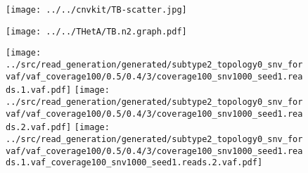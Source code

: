 \documentclass{article}
\begin{document}
\begin{figure}[H]
 \texttt{[image: ../../cnvkit/TB-scatter.jpg]}
\end{figure}

\begin{figure}[H]
  \texttt{[image: ../../THetA/TB.n2.graph.pdf]}
\end{figure}

\begin{figure}[H]
\end{figure}

\begin{figure}[H]
\end{figure}

\begin{figure}[H]
 \texttt{[image: ../src/read\_generation/generated/subtype2\_topology0\_snv\_forvaf/vaf\_coverage100/0.5/0.4/3/coverage100\_snv1000\_seed1.reads.1.vaf.pdf]}
 \texttt{[image: ../src/read\_generation/generated/subtype2\_topology0\_snv\_forvaf/vaf\_coverage100/0.5/0.4/3/coverage100\_snv1000\_seed1.reads.2.vaf.pdf]}
 \texttt{[image: ../src/read\_generation/generated/subtype2\_topology0\_snv\_forvaf/vaf\_coverage100/0.5/0.4/3/coverage100\_snv1000\_seed1.reads.1.vaf\_coverage100\_snv1000\_seed1.reads.2.vaf.pdf]}
\end{figure}
\end{document}
